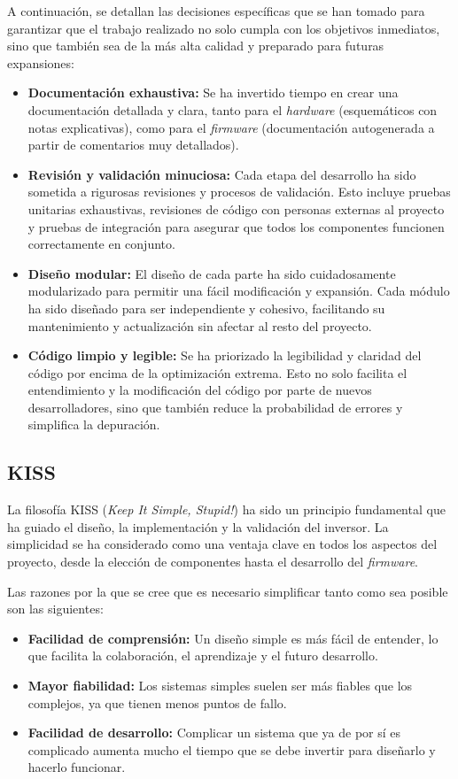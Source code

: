 A continuación, se detallan las decisiones específicas que se han tomado para garantizar que el trabajo realizado no solo cumpla con los objetivos inmediatos, sino que también sea de la más alta calidad y preparado para futuras expansiones:

\begin{itemize}
	\item \textbf{Documentación exhaustiva:} Se ha invertido tiempo en crear una documentación detallada y clara, tanto para el \textit{hardware} (esquemáticos con notas explicativas), como para el \textit{firmware} (documentación autogenerada a partir de comentarios muy detallados).
	
	\item \textbf{Revisión y validación minuciosa:} Cada etapa del desarrollo ha sido sometida a rigurosas revisiones y procesos de validación. Esto incluye pruebas unitarias exhaustivas, revisiones de código con personas externas al proyecto y pruebas de integración para asegurar que todos los componentes funcionen correctamente en conjunto.
	
	\item \textbf{Diseño modular:} El diseño de cada parte ha sido cuidadosamente modularizado para permitir una fácil modificación y expansión. Cada módulo ha sido diseñado para ser independiente y cohesivo, facilitando su mantenimiento y actualización sin afectar al resto del proyecto.
	
	\item \textbf{Código limpio y legible:} Se ha priorizado la legibilidad y claridad del código por encima de la optimización extrema. Esto no solo facilita el entendimiento y la modificación del código por parte de nuevos desarrolladores, sino que también reduce la probabilidad de errores y simplifica la depuración.
\end{itemize}

\subsection{KISS}
La filosofía KISS (\textit{Keep It Simple, Stupid!}) \cite{KISS} ha sido un principio fundamental que ha guiado el diseño, la implementación y la validación del inversor. La simplicidad se ha considerado como una ventaja clave en todos los aspectos del proyecto, desde la elección de componentes hasta el desarrollo del \textit{firmware}.

Las razones por la que se cree que es necesario simplificar tanto como sea posible son las siguientes:
\begin{itemize}
	\item \textbf{Facilidad de comprensión:} Un diseño simple es más fácil de entender, lo que facilita la colaboración, el aprendizaje y el futuro desarrollo.
	\item \textbf{Mayor fiabilidad:} Los sistemas simples suelen ser más fiables que los complejos, ya que tienen menos puntos de fallo.
	\item \textbf{Facilidad de desarrollo:} Complicar un sistema que ya de por sí es complicado aumenta mucho el tiempo que se debe invertir para diseñarlo y hacerlo funcionar.
\end{itemize}

